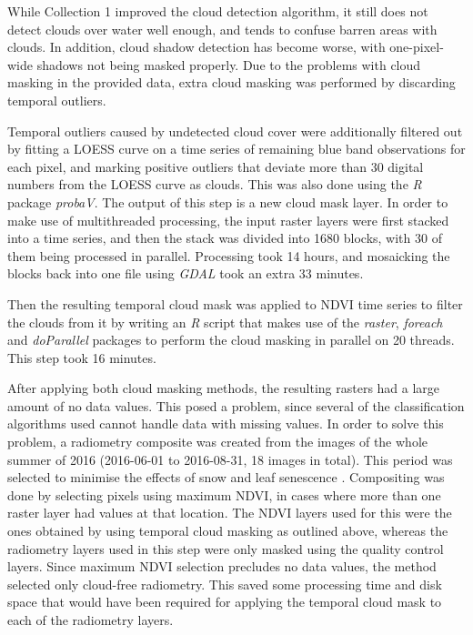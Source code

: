 \documentclass[a4paper,12pt]{scrbook}
\begin{document}
While Collection 1 improved the cloud detection algorithm, it still does not detect clouds over water well enough, and tends to confuse barren areas with clouds. In addition, cloud shadow detection has become worse, with one-pixel-wide shadows not being masked properly. Due to the problems with cloud masking in the provided data, extra cloud masking was performed by discarding temporal outliers.

Temporal outliers caused by undetected cloud cover were additionally filtered out by fitting a LOESS curve on a time series of remaining blue band observations for each pixel, and marking positive outliers that deviate more than 30 digital numbers from the LOESS curve as clouds. This was also done using the \textit{R} package \textit{probaV}. The output of this step is a new cloud mask layer. In order to make use of multithreaded processing, the input raster layers were first stacked into a time series, and then the stack was divided into 1680 blocks, with 30 of them being processed in parallel. Processing took 14 hours, and mosaicking the blocks back into one file using \textit{GDAL} took an extra 33 minutes.

Then the resulting temporal cloud mask was applied to NDVI time series to filter the clouds from it by writing an \textit{R} script that makes use of the \textit{raster}, \textit{foreach} and \textit{doParallel} packages to perform the cloud masking in parallel on 20 threads. This step took 16 minutes.

After applying both cloud masking methods, the resulting rasters had a large amount of no data values. This posed a problem, since several of the classification algorithms used cannot handle data with missing values. In order to solve this problem, a radiometry composite was created from the images of the whole summer of 2016 (2016-06-01 to 2016-08-31, 18 images in total). This period was selected to minimise the effects of snow and leaf senescence \citep{bartalev2014probavboreal}. Compositing was done by selecting pixels using maximum NDVI, in cases where more than one raster layer had values at that location. The NDVI layers used for this were the ones obtained by using temporal cloud masking as outlined above, whereas the radiometry layers used in this step were only masked using the quality control layers. Since maximum NDVI selection precludes no data values, the method selected only cloud-free radiometry. This saved some processing time and disk space that would have been required for applying the temporal cloud mask to each of the radiometry layers.
\end{document}
